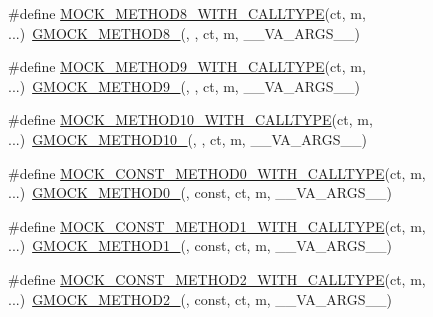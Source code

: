 \begin{DoxyCompactItemize}
\item 
\#define \hyperlink{gmock-generated-function-mockers_8h_a5d207db39768c12d6fecab03cfbe4d75}{M\+O\+C\+K\+\_\+\+M\+E\+T\+H\+O\+D8\+\_\+\+W\+I\+T\+H\+\_\+\+C\+A\+L\+L\+T\+Y\+PE}(ct,  m, ...)~\hyperlink{gmock-generated-function-mockers_8h_aa84a36427c44505207b7cad5dec7ad67}{G\+M\+O\+C\+K\+\_\+\+M\+E\+T\+H\+O\+D8\+\_\+}(, , ct, m, \+\_\+\+\_\+\+V\+A\+\_\+\+A\+R\+G\+S\+\_\+\+\_\+)
\item 
\#define \hyperlink{gmock-generated-function-mockers_8h_a38494187d78c6a395f78c074d204f593}{M\+O\+C\+K\+\_\+\+M\+E\+T\+H\+O\+D9\+\_\+\+W\+I\+T\+H\+\_\+\+C\+A\+L\+L\+T\+Y\+PE}(ct,  m, ...)~\hyperlink{gmock-generated-function-mockers_8h_aa820171a19cc587c247dbe05cbffc55f}{G\+M\+O\+C\+K\+\_\+\+M\+E\+T\+H\+O\+D9\+\_\+}(, , ct, m, \+\_\+\+\_\+\+V\+A\+\_\+\+A\+R\+G\+S\+\_\+\+\_\+)
\item 
\#define \hyperlink{gmock-generated-function-mockers_8h_af9641034cbd1f178dacd3515633d951f}{M\+O\+C\+K\+\_\+\+M\+E\+T\+H\+O\+D10\+\_\+\+W\+I\+T\+H\+\_\+\+C\+A\+L\+L\+T\+Y\+PE}(ct,  m, ...)~\hyperlink{gmock-generated-function-mockers_8h_a81a48223a8771de36ef92ac6d56f6e81}{G\+M\+O\+C\+K\+\_\+\+M\+E\+T\+H\+O\+D10\+\_\+}(, , ct, m, \+\_\+\+\_\+\+V\+A\+\_\+\+A\+R\+G\+S\+\_\+\+\_\+)
\item 
\#define \hyperlink{gmock-generated-function-mockers_8h_a001804410911b4ae2bc6f02a45a467e4}{M\+O\+C\+K\+\_\+\+C\+O\+N\+S\+T\+\_\+\+M\+E\+T\+H\+O\+D0\+\_\+\+W\+I\+T\+H\+\_\+\+C\+A\+L\+L\+T\+Y\+PE}(ct,  m, ...)~\hyperlink{gmock-generated-function-mockers_8h_ae0d290ffa58d7c624b2e3487ba1252f4}{G\+M\+O\+C\+K\+\_\+\+M\+E\+T\+H\+O\+D0\+\_\+}(, const, ct, m, \+\_\+\+\_\+\+V\+A\+\_\+\+A\+R\+G\+S\+\_\+\+\_\+)
\item 
\#define \hyperlink{gmock-generated-function-mockers_8h_a94f4b0954d3d72011acf5f288ca40d42}{M\+O\+C\+K\+\_\+\+C\+O\+N\+S\+T\+\_\+\+M\+E\+T\+H\+O\+D1\+\_\+\+W\+I\+T\+H\+\_\+\+C\+A\+L\+L\+T\+Y\+PE}(ct,  m, ...)~\hyperlink{gmock-generated-function-mockers_8h_a1bc0012d62440dda77208dabdf4925c9}{G\+M\+O\+C\+K\+\_\+\+M\+E\+T\+H\+O\+D1\+\_\+}(, const, ct, m, \+\_\+\+\_\+\+V\+A\+\_\+\+A\+R\+G\+S\+\_\+\+\_\+)
\item 
\#define \hyperlink{gmock-generated-function-mockers_8h_a7c0507949996b9bae8b03fb6ea90d7a4}{M\+O\+C\+K\+\_\+\+C\+O\+N\+S\+T\+\_\+\+M\+E\+T\+H\+O\+D2\+\_\+\+W\+I\+T\+H\+\_\+\+C\+A\+L\+L\+T\+Y\+PE}(ct,  m, ...)~\hyperlink{gmock-generated-function-mockers_8h_a885295ca6bebb15efb3fc786218c5d47}{G\+M\+O\+C\+K\+\_\+\+M\+E\+T\+H\+O\+D2\+\_\+}(, const, ct, m, \+\_\+\+\_\+\+V\+A\+\_\+\+A\+R\+G\+S\+\_\+\+\_\+)

\end{DoxyCompactItemize}
